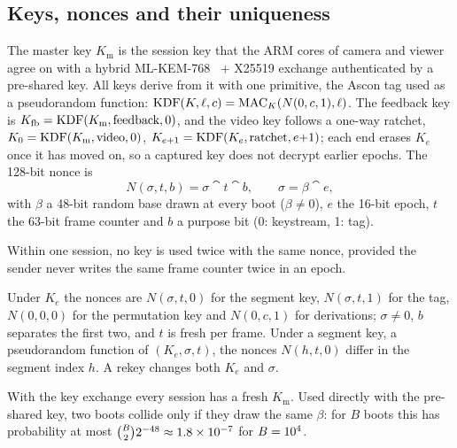 \subsection{Keys, nonces and their uniqueness}\label{sec:nonce}
The master key $K_{\mathrm{m}}$ is the session key that the ARM cores of camera and viewer agree on with a hybrid ML-KEM-768~\cite{fips203} + X25519 exchange authenticated by a pre-shared key. All keys derive from it with one primitive, the Ascon tag used as a pseudorandom function: $\mathrm{KDF}(K, \ell, c) = \mathrm{MAC}_K(N(0, c, 1), \ell)$. The feedback key is $K_{\mathrm{fb}} = \mathrm{KDF}(K_{\mathrm{m}}, \text{feedback}, 0)$, and the video key follows a one-way ratchet, $K_0 = \mathrm{KDF}(K_{\mathrm{m}}, \text{video}, 0)$, $K_{e+1} = \mathrm{KDF}(K_e, \text{ratchet}, e{+}1)$; each end erases $K_e$ once it has moved on, so a captured key does not decrypt earlier epochs. The 128-bit nonce is
\begin{equation}
N(\sigma, t, b) = \sigma \cat t \cat b, \qquad \sigma = \beta \cat e,
\label{eq:nonce}
\end{equation}
with $\beta$ a 48-bit random base drawn at every boot ($\beta \ne 0$), $e$ the 16-bit epoch, $t$ the 63-bit frame counter and $b$ a purpose bit (0: keystream, 1: tag).

\begin{proposition}\label{prop:nonce}
Within one session, no key is used twice with the same nonce, provided the sender never writes the same frame counter twice in an epoch.
\end{proposition}
\begin{IEEEproof}
Under $K_e$ the nonces are $N(\sigma, t, 0)$ for the segment key, $N(\sigma, t, 1)$ for the tag, $N(0, 0, 0)$ for the permutation key and $N(0, c, 1)$ for derivations; $\sigma \ne 0$, $b$ separates the first two, and $t$ is fresh per frame. Under a segment key, a pseudorandom function of $(K_e, \sigma, t)$, the nonces $N(h, t, 0)$ differ in the segment index $h$. A rekey changes both $K_e$ and $\sigma$.
\end{IEEEproof}
With the key exchange every session has a fresh $K_{\mathrm{m}}$. Used directly with the pre-shared key, two boots collide only if they draw the same $\beta$: for $B$ boots this has probability at most $\binom{B}{2} 2^{-48} \approx 1.8\times 10^{-7}$ for $B = 10^4$.

